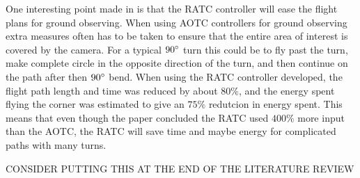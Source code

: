 One interesting point made in \cite{ratcFISHER} is that the RATC controller will ease the flight plans for ground observing. When using AOTC controllers for ground observing extra measures often has to be taken to ensure that the entire area of interest is covered by the camera. For a typical $90 \degree$ turn this could be to fly past the turn, make complete circle in the opposite direction of the turn, and then continue on the path after then $90 \degree$ bend. When using the RATC controller developed, the flight path length and time was reduced by about $80 \%$, and the energy spent flying the corner was estimated to give an $75 \%$ redutcion in energy spent. This means that even though the paper concluded the RATC used $400 \%$ more input than the AOTC, the RATC will save time and maybe energy for complicated paths with many turns.

CONSIDER PUTTING THIS AT THE END OF THE LITERATURE REVIEW